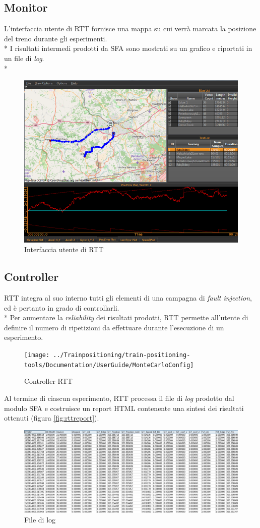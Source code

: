 \subsection{Monitor}
L'interfaccia utente di RTT fornisce una mappa su cui verr\`a marcata la posizione del treno durante gli esperimenti.\\*
I risultati intermedi prodotti da SFA sono mostrati su un grafico e riportati in un file di \emph{log}.\\*
\begin{figure}[h]
	\centering
	\includegraphics[width=0.7\linewidth]{img/rtthci2}
	\caption{Interfaccia utente di RTT}
	\label{fig:rtthci2}
\end{figure}
\subsection{Controller}
RTT integra al suo interno tutti gli elementi di una campagna di \emph{fault injection}, ed \`e pertanto in grado di controllarli.\\*
Per aumentare la \emph{reliability} dei risultati prodotti, RTT permette all'utente di definire il numero di ripetizioni da effettuare durante l'esecuzione di un esperimento.
\begin{figure}[h]
	\centering
	\texttt{[image: ../Trainpositioning/train-positioning-tools/Documentation/UserGuide/MonteCarloConfig]}
	\caption{Controller RTT}
	\label{fig:montecarloconfig}
\end{figure}
Al termine di ciascun esperimento, RTT processa il file di \emph{log} prodotto dal modulo SFA e costruisce un report HTML contenente una sintesi dei risultati ottenuti (figura \ref{fig:rttreport}).
\begin{figure}
	\centering
	\includegraphics[width=\linewidth]{img/fusionlog}
	\caption{File di log}
	\label{fig:fusionlog}
\end{figure}
